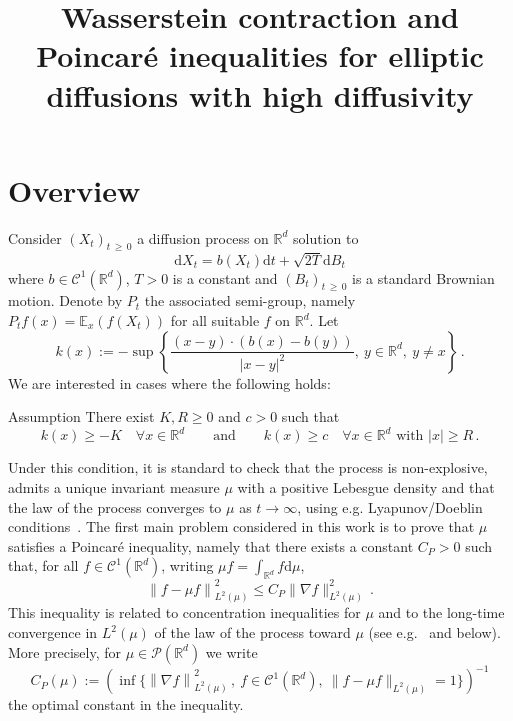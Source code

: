 \documentclass[AHL,Unicode,longabstracts,published]{cedram}
\title[Wasserstein contraction and Poincaré inequalities for elliptic diffusions]{Wasserstein contraction and Poincaré inequalities for elliptic diffusions with high diffusivity}
\author[\initial{P.} \lastname{Monmarché}]{\firstname{Pierre} \lastname{Monmarché}}
\newcommand{\R}{\mathbb R}
\newcommand{\bbE}{\mathbb E}
\newcommand{\clP}{\mathcal P}
\newcommand{\clC}{\mathcal C}
\newcommand{\dd}{\mathrm{d}}
\newcommand{\na}{\nabla}
\newcommand{\1}{\mathbbm{1}}
\let\oldforall\forall
\renewcommand*{\forall}{\mathrel{\oldforall}}
\newcommand{\R}{\mathbb R}
\begin{document}
\maketitle

\section{Overview}\label{sec1}

Consider $(X_t)_{t\,\geqslant\,0}$ a diffusion process on $\R^d$ solution to
\begin{equation}\label{eq:EDS}
\dd X_t = b(X_t) \dd t + \sqrt{2T}\dd B_t
\end{equation}
where $b\in\clC^1(\R^d)$, $T>0$ is a constant and $(B_t)_{t\,\geqslant\,0}$ is a standard Brownian motion. Denote by $P_t$ the associated semi-group, namely $P_t f(x) = \bbE_x( f(X_t))$ for all suitable $f$ on $\R^d$. Let
\begin{equation}\label{eq:defk}
k(x):= - \sup \left\{ \frac{ (x-y)\cdot \left( b(x)-b(y)\right) }{|x-y|^2},\ y\in\R^d,\ y\neq x\right\}\,.
\end{equation}
We are interested in cases where the following holds:

\begin{enonce}{Assumption}\label{Assu1}
There exist $K,R\geqslant 0$ and $c>0$ such that
\begin{equation}\label{eq:conditionk}
k(x) \geqslant -K\quad \forall x\in\R^d \qquad \text{and}\qquad k(x) \geqslant c \quad \forall x\in\R^d\text{ with }|x|\geqslant R\,.
\end{equation}
\end{enonce}

Under this condition, it is standard to check that the process is non-explosive, admits a unique invariant measure $\mu$ with a positive Lebesgue density and that the law of the process converges to $\mu$ as $t\rightarrow \infty$, using e.g. Lyapunov/Doeblin conditions~\cite{BakryCattiauxGuillin,HairerMattingly2008,MeynTweedieLivre}. The first main problem considered in this work is to prove that $\mu$ satisfies a Poincaré inequality, namely that there exists a constant $C_P>0$ such that, for all $f\in\clC^1(\R^d)$, writing $\mu f= \int_{\R^d} f \dd \mu$,
\[
\left\| f - \mu f\right\|_{L^2(\mu)}^2 \leqslant C_P \| \na f\|_{L^2(\mu)}^2\,.
\]
This inequality is related to concentration inequalities for $\mu$ and to the long-time convergence in $L^2(\mu)$ of the law of the process toward $\mu$ (see e.g.~\cite{BakryGentilLedoux,CattiauxGuillinDeviation} and below). More precisely, for $\mu \in \clP(\R^d)$ we write
\[
C_P(\mu) := \left( \inf\{ \left\| \na f\right\|_{L^2(\mu)}^2\,, \ f\in \clC^1(\R^d),\ \| f - \mu f\|_{L^2(\mu)} =1\}\right)^{-1}
\]
the optimal constant in the inequality.
\end{document}
